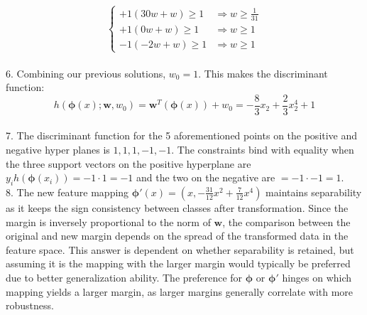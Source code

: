 \documentclass[submit]{harvardml}
\begin{document}
    \[
    \begin{cases}
        +1(30w + w) \geq 1 & \Rightarrow w \geq \frac{1}{31} \\
        +1(0w + w) \geq 1 & \Rightarrow w \geq 1 \\
        -1(-2w + w) \geq 1 & \Rightarrow w \geq 1
    \end{cases}
    \] \\
6.  Combining our previous solutions, \(w_0 = 1\). This makes the discriminant function: 
    \[
    h(\boldsymbol{\phi}(x); \mathbf{w}, w_0) = \mathbf{w}^T(\boldsymbol{\phi}(x)) + w_0 = -\frac{8}{3}x_2 + \frac{2}{3}x_2^4 + 1
    \] \\
7. The discriminant function for the 5 aforementioned points on the positive and negative hyper planes is \(1, 1, 1, -1, -1\). The constraints bind with equality when the three support vectors on the positive hyperplane are \(y_ih(\boldsymbol{\phi}(x_i)) = -1 \cdot 1 = -1\) and the two on the negative are \(= -1 \cdot -1 = 1\). \\
8. The new feature mapping $\boldsymbol{\phi}'(x) = (x, -\frac{31}{12}x^2 + \frac{7}{12}x^4)$ maintains separability as it keeps the sign consistency between classes after transformation. Since the margin is inversely proportional to the norm of $\mathbf{w}$, the comparison between the original and new margin depends on the spread of the transformed data in the feature space. This answer is dependent on whether separability is retained, but assuming it is the mapping with the larger margin would typically be preferred due to better generalization ability. The preference for $\boldsymbol{\phi}$ or $\boldsymbol{\phi}'$ hinges on which mapping yields a larger margin, as larger margins generally correlate with more robustness.




\end{document}
